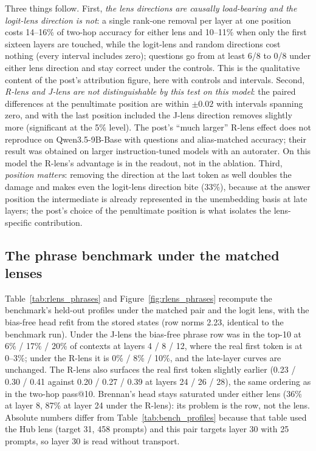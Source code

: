 \documentclass[11pt]{article}
\begin{document}
Three things follow. First, \emph{the lens directions are causally load-bearing and the logit-lens direction is not}: a single rank-one removal per layer at one position costs 14--16\% of two-hop accuracy for either lens and 10--11\% when only the first sixteen layers are touched, while the logit-lens and random directions cost nothing (every interval includes zero); \ATwipe{} questions go from at least 6/8 to 0/8 under either lens direction and stay correct under the controls. This is the qualitative content of the post's attribution figure, here with controls and intervals. Second, \emph{R-lens and J-lens are not distinguishable by this test on this model}: the paired differences at the penultimate position are within $\pm0.02$ with intervals spanning zero, and with the last position included the J-lens direction removes slightly more (significant at the 5\% level). The post's ``much larger'' R-lens effect does not reproduce on Qwen3.5-9B-Base with \ATnGood{} questions and alias-matched accuracy; their result was obtained on larger instruction-tuned models with an autorater. On this model the R-lens's advantage is in the readout, not in the ablation. Third, \emph{position matters}: removing the direction at the last token as well doubles the damage and makes even the logit-lens direction bite (33\%), because at the answer position the intermediate is already represented in the unembedding basis at late layers; the post's choice of the penultimate position is what isolates the lens-specific contribution.

\subsection{The phrase benchmark under the matched lenses}
Table~\ref{tab:rlens_phrases} and Figure~\ref{fig:rlens_phrases} recompute the benchmark's held-out profiles under the matched pair and the logit lens, with the bias-free head refit from the stored states (row norms 2.23, identical to the benchmark run). Under the J-lens the bias-free phrase row was in the top-10 at 6\% / 17\% / 20\% of contexts at layers 4 / 8 / 12, where the real first token is at 0--3\%; under the R-lens it is 0\% / 8\% / 10\%, and the late-layer curves are unchanged. The R-lens also surfaces the real first token slightly earlier (0.23 / 0.30 / 0.41 against 0.20 / 0.27 / 0.39 at layers 24 / 26 / 28), the same ordering as in the two-hop pass@10. Brennan's head stays saturated under either lens (36\% at layer 8, 87\% at layer 24 under the R-lens): its problem is the row, not the lens. Absolute numbers differ from Table~\ref{tab:bench_profiles} because that table used the Hub lens (target 31, 458 prompts) and this pair targets layer 30 with 25 prompts, so layer 30 is read without transport.
\end{document}

